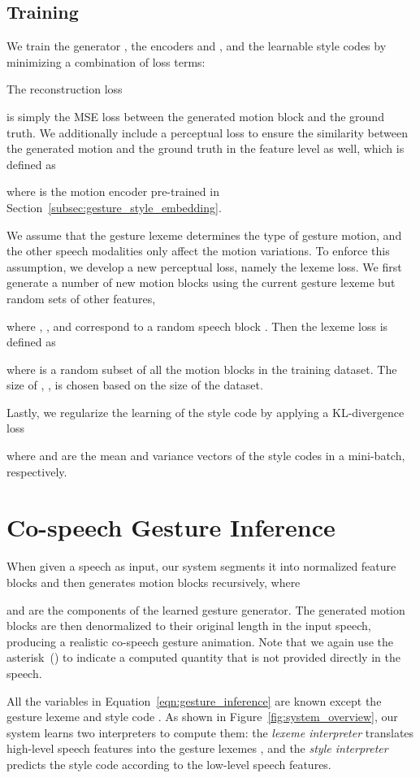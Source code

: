 \documentclass[acmtog,authorversion]{acmart}
\newcommand{\fig}{Figure{}~}
\newcommand{\eqn}{Equation{}~}
\begin{document}
\subsection{Training}
We train the generator , the encoders  and , and the learnable style codes  by minimizing a combination of loss terms:

The reconstruction loss 

is simply the MSE loss between the generated motion block and the ground truth. We additionally include a perceptual loss to ensure the similarity between the generated motion and the ground truth in the feature level as well, which is defined as

where  is the motion encoder pre-trained in Section~\ref{subsec:gesture_style_embedding}.

We assume that the gesture lexeme determines the type of gesture motion, and the other speech modalities only affect the motion variations. To enforce this assumption, we develop a new perceptual loss, namely the lexeme loss. We first generate a number of new motion blocks using the current gesture lexeme but random sets of other features, 

where , , and  correspond to a random speech block . Then the lexeme loss is defined as 

where  is a random subset of all the motion blocks in the training dataset. The size of , , is chosen based on the size of the dataset.

Lastly, we regularize the learning of the style code by applying a KL-divergence loss

where  and  are the mean and variance vectors of the style codes in a mini-batch, respectively. \section{Co-speech Gesture Inference}
\label{sec:co-speech_gesture_inference}
When given a speech as input, our system segments it into normalized feature blocks  and then generates motion blocks  recursively, where 

and  are the components of the learned gesture generator. The generated motion blocks are then denormalized to their original length in the input speech, producing a realistic co-speech gesture animation. Note that we again use the asterisk~() to indicate a computed quantity that is not provided directly in the speech. 

All the variables in \eqn\eqref{eqn:gesture_inference} are known except the gesture lexeme  and style code . As shown in \fig\ref{fig:system_overview}, our system learns two interpreters to compute them: the \emph{lexeme interpreter}  translates high-level speech features into the gesture lexemes , and the \emph{style interpreter}  predicts the style code  according to the low-level speech features. 
\end{document}
